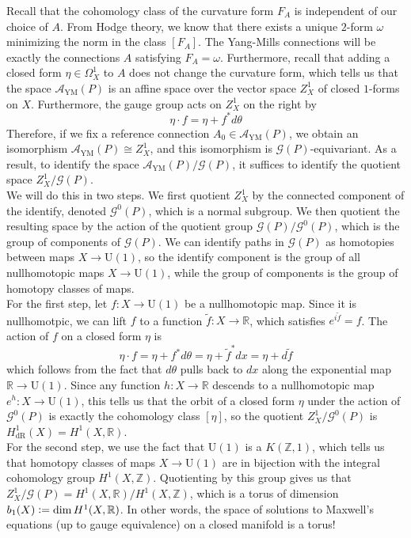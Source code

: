 \documentclass[psamsfonts, 12pt]{amsart}
\theoremstyle{definition}
\theoremstyle{remark}
\newcommand{\R}{\mathbb{R}}
\newcommand{\Z}{\mathbb{Z}}
\newcommand{\defeq}{\vcentcolon=}
\begin{document}
Recall that the cohomology class  of the curvature form $F_A$ is independent
of our choice of $A$. From Hodge theory, we know that there exists a unique
$2$-form $\omega$ minimizing the norm in the class $[F_A]$. The Yang-Mills connections
will be exactly the connections $A$ satisfying $F_A = \omega$. Furthermore,
recall that adding a closed form $\eta \in \Omega^1_X$ to $A$ does not change
the curvature form, which tells us that the space $\mathscr{A}_{\mathrm{YM}}(P)$
is an affine space over the vector space $Z^1_X$ of closed $1$-forms on $X$. Furthermore,
the gauge group acts on $Z^1_X$ on the right by
\[
\eta \cdot f = \eta + f^*d\theta
\]
Therefore, if we fix a reference connection $A_0 \in \mathscr{A}_{\mathrm{YM}}(P)$, we
obtain an isomorphism $\mathscr{A}_{\mathrm{YM}}(P) \cong Z^1_X$, and this isomorphism
is $\mathscr{G}(P)$-equivariant. As a result, to identify the space
$\mathscr{A}_{\mathrm{YM}}(P)/\mathscr{G}(P)$, it suffices to identify the quotient
space $Z^1_X/\mathscr{G}(P)$. \\

We will do this in two steps. We first quotient $Z^1_X$ by the connected component of
the identify, denoted $\mathscr{G}^0(P)$, which is a normal subgroup. We then quotient
the resulting space by the action of the quotient group
$\mathscr{G}(P)/\mathscr{G}^0(P)$, which is the group of components of $\mathscr{G}(P)$.
We can identify paths in $\mathscr{G}(P)$ as homotopies between maps
$X \to \mathrm{U}(1)$, so the identify component is the group of all
nullhomotopic maps $X \to \mathrm{U}(1)$, while the group of components is the
group of homotopy classes of maps. \\

For the first step, let $f : X \to \mathrm{U}(1)$ be a nullhomotopic map. Since
it is nullhomotpic, we can lift $f$ to a function $\widetilde{f} : X \to \R$,
which satisfies $e^{i\widetilde{f}} = f$. The action of $f$ on a closed
form $\eta$ is
\[
\eta \cdot f = \eta + f^*d\theta = \eta + \widetilde{f}^*dx = \eta + d\widetilde{f}
\]
which follows from the fact that $d\theta$ pulls back to $dx$ along the
exponential map $\R \to \mathrm{U}(1)$. Since any function $h : X \to \R$
descends to a nullhomotopic map $e^h : X \to \mathrm{U}(1)$, this tells us that
the orbit of a closed form $\eta$ under the action of $\mathscr{G}^0(P)$ is
exactly the cohomology class $[\eta]$, so the quotient $Z^1_X/\mathscr{G}^0(P)$ is
$H^1_{\mathrm{dR}}(X) = H^1(X,\R)$. \\

For the second step, we use the fact that $\mathrm{U}(1)$ is a $K(\Z,1)$, which
tells us that homotopy classes of maps $X \to \mathrm{U}(1)$ are in bijection
with the integral cohomology group $H^1(X,\Z)$. Quotienting by this group
gives us that $Z^1_X / \mathscr{G}(P) = H^1(X,\R)/H^1(X,\Z)$, which is a torus
of dimension $b_1(X) \defeq \dim H^1(X,\R)$. In other words, the space of
solutions to Maxwell's equations (up to gauge equivalence) on a closed manifold
is a torus!
%
\end{document}
